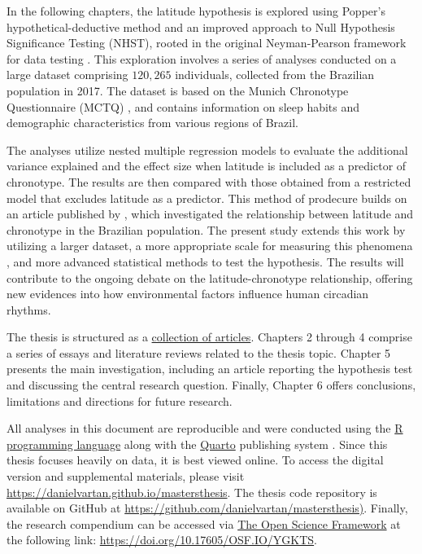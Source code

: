\documentclass[
12pt,
openright,
oneside,
a4paper,
chapter=TITLE,
section=TITLE,
french,
spanish,
brazil,
english
]{abntex2}\usepackage{array}
\begin{document}
In the following chapters, the latitude hypothesis is explored using
Popper's hypothetical-deductive method \autocite{popper1979} and an
improved approach to Null Hypothesis Significance Testing (NHST), rooted
in the original Neyman-Pearson framework for data testing
\autocite{neyman1928,neyman1928a,perezgonzalez2015}. This exploration
involves a series of analyses conducted on a large dataset comprising
\(120,265\) individuals, collected from the Brazilian population in
2017. The dataset is based on the Munich Chronotype Questionnaire (MCTQ)
\autocite{roenneberg2003,roenneberg2012a}, and contains information on
sleep habits and demographic characteristics from various regions of
Brazil.

The analyses utilize nested multiple regression models to evaluate the
additional variance explained and the effect size when latitude is
included as a predictor of chronotype. The results are then compared
with those obtained from a restricted model that excludes latitude as a
predictor. This method of prodecure builds on an article published by
\textcite{leocadio-miguel2017}, which investigated the relationship
between latitude and chronotype in the Brazilian population. The present
study extends this work by utilizing a larger dataset, a more
appropriate scale for measuring this phenomena
\autocite{leocadio-miguel2014}, and more advanced statistical methods to
test the hypothesis. The results will contribute to the ongoing debate
on the latitude-chronotype relationship, offering new evidences into how
environmental factors influence human circadian rhythms.

The thesis is structured as a
\href{https://en.wikipedia.org/wiki/Collection_of_articles}{collection
of articles}. Chapters 2 through 4 comprise a series of essays and
literature reviews related to the thesis topic. Chapter 5 presents the
main investigation, including an article reporting the hypothesis test
and discussing the central research question. Finally, Chapter 6 offers
conclusions, limitations and directions for future research.

All analyses in this document are reproducible and were conducted using
the \href{https://www.r-project.org/}{R programming language}
\autocite{rcoreteam} along with the \href{https://quarto.org/}{Quarto}
publishing system \autocite{allaire}. Since this thesis focuses heavily
on data, it is best viewed online. To access the digital version and
supplemental materials, please visit
\href{https://danielvartan.github.io/mastersthesis/}{https://danielvartan.github.io/mastersthesis}.
The thesis code repository is available on GitHub at
\href{https://github.com/danielvartan/mastersthesis}{https://github.com/danielvartan/mastersthesis)}.
Finally, the research compendium can be accessed via
\href{https://osf.io/}{The Open Science Framework} at the following
link: \url{https://doi.org/10.17605/OSF.IO/YGKTS}.
\end{document}
